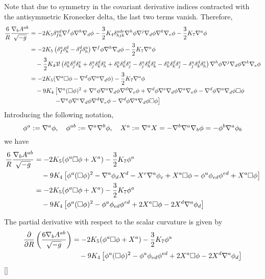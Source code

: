 Note that due to symmetry in the covariant derivative indices contracted with the antisymmetric Kronecker delta, the last two terms vanish. Therefore,
\begin{align*}
  \frac{6}{R}\frac{\nabla_b A^{ab}}{\sqrt{-g}}&=-2K_5\delta^{ad}_{fh}\nabla^f\phi\nabla^h\nabla_d\phi-\frac{3}{2}K_4\delta^{ade}_{hjk}\nabla^h\phi\nabla^j\nabla_d\phi\nabla^k\nabla_e\phi -\frac{3}{2}K_7\nabla^{a}\phi \\
  &=-2K_5\left(\delta^{a}_f\delta^d_h-\delta^d_f\delta^{a}_h\right)\nabla^f\phi\nabla^h\nabla_d\phi-\frac{3}{2}K_7\nabla^{a}\phi  \\
  &\quad -\frac{3}{2}K_43!\left(\delta^{a}_h\delta^d_j\delta^{e}_k+\delta^{a}_j\delta^d_k\delta^{e}_h+\delta^{a}_k\delta^d_h\delta^{e}_j-\delta^{a}_j\delta^d_h\delta^{e}_k-\delta^{a}_h\delta^d_k\delta^{e}_j-\delta^{a}_j\delta^d_k\delta^{e}_h\right)\nabla^h\phi\nabla^j\nabla_d\phi\nabla^k\nabla_e\phi \\
  &=-2K_5 (\nabla^{a}\Box\phi -\nabla^d\phi\nabla^{a}\nabla_d\phi )-\frac{3}{2}K_7\nabla^{a}\phi \\
  &\quad -9K_4\left[\nabla^{a}(\Box\phi )^2+\nabla^{e}\phi\nabla^{a}\nabla_d \phi\nabla^d\nabla_e\phi +\nabla^d\phi\nabla^{e}\nabla_d\phi \nabla^{a}\nabla_e\phi -\nabla^d\phi\nabla^{a}\nabla_d\phi \Box\phi \right.\\
  &\left.\qquad \qquad -\nabla^{a}\phi \nabla^{e}\nabla_d\phi\nabla^d\nabla_e\phi -\nabla^d\phi\nabla^{a}\nabla_d\phi\Box\phi  \right]
\end{align*}
Introducing the following notation,
\begin{equation}
  \phi^{a}:=\nabla^{a}\phi,\quad \phi^{ab}:=\nabla^{a}\nabla^b \phi ,\quad X^{a}:=\nabla^{a}X=-\nabla^b \nabla^{a}\nabla_b\phi =-\phi^b \nabla^{a}\phi_b 
\end{equation}
we have
\begin{align*}
  \frac{6}{R}\frac{\nabla_b A^{ab}}{\sqrt{-g}}&=-2K_5(\phi^{a}\Box\phi +X^{a})-\frac{3}{2}K_7\phi^{a}\\
  &\quad -9K_4\left[\phi^{a}(\Box\phi )^2-\nabla^{a}\phi_dX^d-X^{e}\nabla^{a}\phi_e+X^{a}\Box\phi -\phi^{a}\phi_{ed}\phi^{ed}+X^{a}\Box\phi \right]\\
  &=-2K_5(\phi^{a}\Box\phi +X^{a})-\frac{3}{2}K_7\phi^{a}\\
  &\quad -9K_4\left[\phi^{a}(\Box\phi )^2-\phi^{a}\phi_{ed}\phi^{ed}+2X^{a}\Box\phi -2X^d\nabla^{a}\phi_d \right]
\end{align*}

The partial derivative with respect to the scalar curvature is given by
\begin{align}
  \pdv{R}\left(\frac{6\nabla_b A^{ab}}{\sqrt{-g}}\right)&=-2K_5(\phi^{a}\Box\phi +X^{a})-\frac{3}{2}K_7\phi^{a}\\
  &\quad -9K_4\left[\phi^{a}(\Box\phi )^2-\phi^{a}\phi_{ed}\phi^{ed}+2X^{a}\Box\phi -2X^d\nabla^{a}\phi_d \right]
\end{align}
[] %

